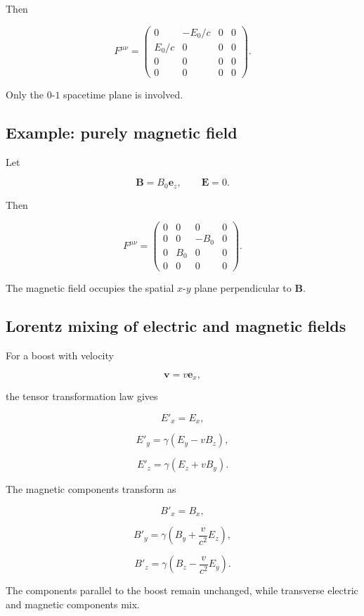 Then

\[
F^{\mu\nu}
=
\begin{pmatrix}
0 & -E_0/c & 0 & 0\\
E_0/c & 0 & 0 & 0\\
0 & 0 & 0 & 0\\
0 & 0 & 0 & 0
\end{pmatrix}.
\]

Only the \(0\)-\(1\) spacetime plane is involved.

\subsection{Example: purely magnetic field}

Let

\[
\mathbf{B}
=
B_0\mathbf{e}_z,
\qquad
\mathbf{E}=0.
\]

Then

\[
F^{\mu\nu}
=
\begin{pmatrix}
0 & 0 & 0 & 0\\
0 & 0 & -B_0 & 0\\
0 & B_0 & 0 & 0\\
0 & 0 & 0 & 0
\end{pmatrix}.
\]

The magnetic field occupies the spatial \(x\)-\(y\) plane perpendicular to \(\mathbf{B}\).

\subsection{Lorentz mixing of electric and magnetic fields}

For a boost with velocity

\[
\mathbf{v}
=
v\mathbf{e}_x,
\]

the tensor transformation law gives

\[
\boxed{
E'_x=E_x
},
\]

\[
\boxed{
E'_y
=
\gamma
\left(
E_y-vB_z
\right)
},
\]

\[
\boxed{
E'_z
=
\gamma
\left(
E_z+vB_y
\right)
}.
\]

The magnetic components transform as

\[
\boxed{
B'_x=B_x
},
\]

\[
\boxed{
B'_y
=
\gamma
\left(
B_y+
\frac{v}{c^2}E_z
\right)
},
\]

\[
\boxed{
B'_z
=
\gamma
\left(
B_z-
\frac{v}{c^2}E_y
\right)
}.
\]

The components parallel to the boost remain unchanged, while transverse electric and magnetic components mix.

